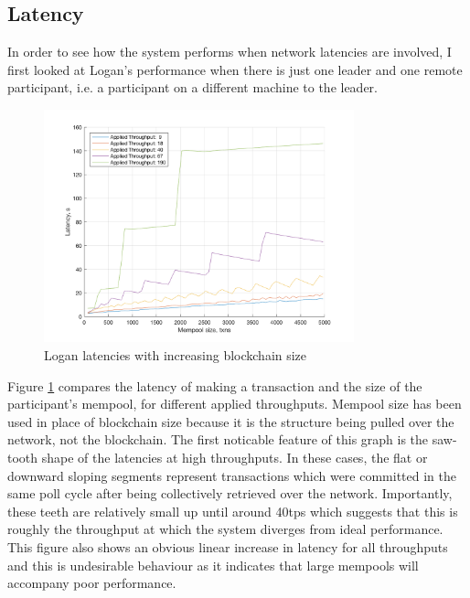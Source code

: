 \documentclass[12pt,a4paper,twoside,openright]{report}
\begin{document}
	\subsection{Latency}
	In order to see how the system performs when network latencies are involved, I first looked at Logan's performance when there is just one leader and one remote participant, i.e. a participant on a different machine to the leader.
	\begin{figure}
		\centering
		\includegraphics[width=0.8\textwidth]{figs/latencies_sizes_throughputs.png}
		\caption{Logan latencies with increasing blockchain size}
		\label{figs:remlatencysize}
	\end{figure}
	Figure \ref{figs:remlatencysize} compares the latency of making a transaction and the size of the participant's mempool, for different applied throughputs.
	Mempool size has been used in place of blockchain size because it is the structure being pulled over the network, not the blockchain.
	The first noticable feature of this graph is the saw-tooth shape of the latencies at high throughputs.
	In these cases, the flat or downward sloping segments represent transactions which were committed in the same poll cycle after being collectively retrieved over the network.
	Importantly, these teeth are relatively small up until around 40tps which suggests that this is roughly the throughput at which the system diverges from ideal performance.
	This figure also shows an obvious linear increase in latency for all throughputs and this is undesirable behaviour as it indicates that large mempools will accompany poor performance. \\
	
\end{document}
